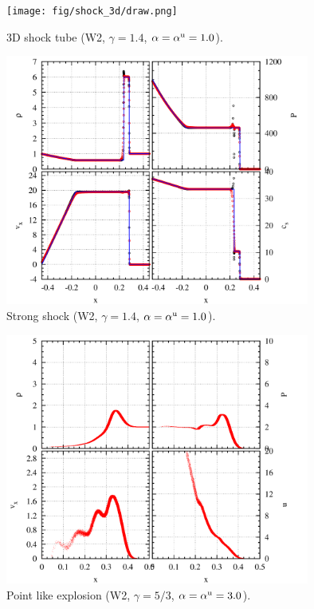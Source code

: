 \documentclass[fleqn,dvipdfmx]{article}
\begin{document}
\begin{figure}
  \begin{center}
    \texttt{[image: fig/shock\_3d/draw.png]}
  \end{center}
  \caption{3D shock tube (W2, $\gamma=1.4$, $\alpha=\alpha^{\rm
      u}=1.0$).}
\end{figure}

\begin{figure}
  \begin{center}
    \includegraphics[width=10cm,bb=0 0 1020 840]{fig/strong/draw.png}
  \end{center}
  \caption{Strong shock (W2, $\gamma=1.4$, $\alpha=\alpha^{\rm
      u}=1.0$).}
\end{figure}

\begin{figure}
  \begin{center}
    \includegraphics[width=10cm,bb=0 0 1020 840]{fig/pex/draw.png}
  \end{center}
  \caption{Point like explosion (W2, $\gamma=5/3$, $\alpha=\alpha^{\rm
      u}=3.0$).}
\end{figure}
\end{document}
